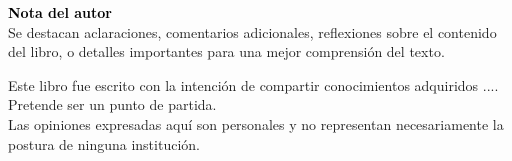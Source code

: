 \thispagestyle{empty}
\vspace*{2cm}
\textcolor{black}{\Huge \textbf{Nota del autor}} \\[0.7cm] %

Se destacan aclaraciones, comentarios adicionales, reflexiones sobre el contenido del libro, 
o detalles importantes para una mejor comprensión del texto.

Este libro fue escrito con la intención de compartir conocimientos adquiridos ....\\

Pretende ser un punto de partida.\\

Las opiniones expresadas aquí son personales y no representan necesariamente la postura de ninguna institución.
\clearpage